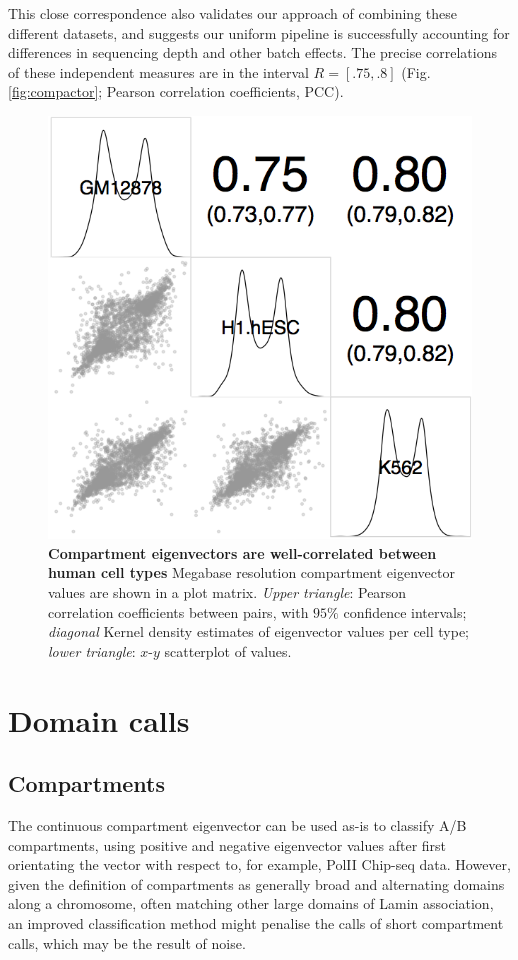 \documentclass[a4paper,10pt,oneside]{book}
\begin{document}
This close correspondence also validates our approach of combining these different datasets, and suggests our uniform pipeline is successfully accounting for differences in sequencing depth and other batch effects. The precise correlations of these independent measures are in the interval $R = [.75, .8]$ (Fig. \ref{fig:compactor}; Pearson correlation coefficients, PCC).

\begin{figure}
\begin{center}
\includegraphics[width=.5\textwidth]{figs/compartment_corr.png}
\captionsetup{width=\textwidth}
\caption{
{\bf Compartment eigenvectors are well-correlated between human cell types}
Megabase resolution compartment eigenvector values are shown in a plot matrix. \emph{Upper triangle}: Pearson correlation coefficients between pairs, with $95\%$ confidence intervals; \emph{diagonal} Kernel density estimates of eigenvector values per cell type; \emph{lower triangle}: $x$-$y$ scatterplot of values.
}\label{fig:compcor}
\end{center}
\end{figure} 

\section{Domain calls}

\subsection{Compartments}

The continuous compartment eigenvector can be used as-is to classify A/B compartments, using positive and negative eigenvector values after first orientating the vector with respect to, for example, PolII Chip-seq data.\cite{Kalhor2012} However, given the definition of compartments as generally broad and alternating domains along a chromosome, often matching other large domains of Lamin association, an improved classification method might penalise the calls of short compartment calls, which may be the result of noise.
\end{document}
